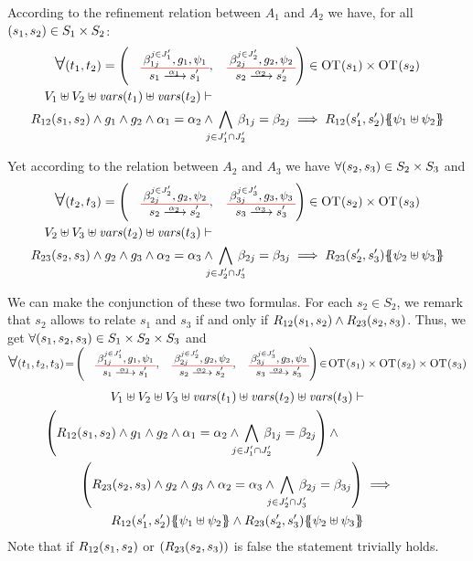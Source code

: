 \documentclass[runningheads]{llncs}
\begin{document}
\begin{enumerate}
According to the refinement relation between  $A_1$ and $A_2$ we have, for all ${\left(s_1,s_{2}\right)} \in S_1 \times S_2$:
\begin{multline*}
\bigsymb{\forall} \mpar{t_1, t_{2}} = \mpar{\OTx{1}{}{1}{1}, \OTx{2}{}{2}{2}} \in \fOT{s_1} \times \fOT{s_2} \\  V_1 \uplus V_2 \uplus \fvars{t_1} \uplus \fvars{t_2} \vdash \hspace{6cm}\\  R_{12}\mpar{s_1, s_2} \wedge 	g_1 \wedge g_{2} \wedge \alpha_1 = \alpha_{2} \wedge \bigwedge_\subbox{j \in J'_1 \cap J'_{2}} \beta_{1j} = \beta_{2j} \implies  R_{12}\mpar{s'_1, s'_{2}}\psubst{\psi_1 \uplus \psi_2}
\end{multline*}

Yet according to the relation between   $A_2$ and $A_3$ we have  $\forall {\left(s_2,s_3\right)} \in S_2 \times S_3$ and
\begin{multline*}
\bigsymb{\forall} \mpar{t_2, t_{3}} = \mpar{\OTx{2}{}{2}{2}, \OTx{3}{}{3}{3}} \in \fOT{s_2} \times \fOT{s_3} \\  V_2 \uplus V_3 \uplus \fvars{t_2} \uplus \fvars{t_3} \vdash \hspace{6cm}\\  R_{23}\mpar{s_2, s_3} \wedge 	g_2 \wedge g_{3} \wedge \alpha_2 = \alpha_{3} \wedge \bigwedge_\subbox{j \in J'_2 \cap J'_{3}} \beta_{2j} = \beta_{3j} \implies  R_{23}\mpar{s'_2, s'_{3}}\psubst{\psi_2 \uplus \psi_3}
\end{multline*}

We can make the conjunction of these two formulas.  For each $s_2 \in S_2$, we remark that  $s_2$  allows to relate $s_1$ and $s_3$ if and only if $R_{12}{\left(s_1, s_2\right)}\land R_{23}{\left(s_2, s_3\right)} $. Thus, we get  $\forall {\left(s_1,s_2,s_3\right)} \in S_1\times S_2 \times S_3$ and $\bigsymb{\forall} \mpar{t_1,t_2, t_{3}}\!=\! \mpar{\OTx{1}{}{1}{1},\OTx{2}{}{2}{2},\OTx{3}{}{3}{3}}\! \in\! \fOT{s_1} \times\fOT{s_2} \times \fOT{s_3}$  
\begin{multline*}
V_1\uplus V_2 \uplus V_3 \uplus \fvars{t_1} \uplus \fvars{t_2} \uplus \fvars{t_3} \vdash\\ \left(R_{12}\mpar{s_1, s_2} \wedge   g_1 \wedge g_{2} \wedge \alpha_1 = \alpha_{2} \wedge \bigwedge_\subbox{j \in J'_1 \cap J'_{2}} \beta_{1j} = \beta_{2j}\right) \wedge \hspace{2.5cm}\\ \mpar{R_{23}\mpar{s_2, s_3} 
\wedge  g_2 \wedge g_{3} \wedge \alpha_2 = \alpha_{3} \wedge \bigwedge_\subbox{j \in J'_2 \cap J'_{3}} \beta_{2j} = \beta_{3j}} \implies\\ R_{12}\mpar{s'_1, s'_{2}}\psubst{\psi_1 \uplus \psi_2} \wedge R_{23}\mpar{s'_2, s'_{3}}\psubst{\psi_2 \uplus \psi_3}
\end{multline*}
Note that if  $R_{12}{\left(s_1, s_2\right)}$ or $ {\left(R_{23}{\left(s_2, s_3\right)}\right)}$ is false the statement trivially holds.


\end{enumerate}
\end{document}
